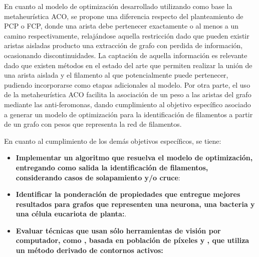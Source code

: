 En cuanto al modelo de optimizaci\'on desarrollado utilizando como base la metaheur\'istica ACO, se propone una diferencia respecto del planteamiento de PCP o FCP, donde una arista debe pertenecer exactamente o al menos a un camino respectivamente, relaj\'andose aquella restricci\'on dado que pueden existir aristas aisladas producto una extracci\'on de grafo con perdida de informaci\'on, ocasionando discontinuidades. La captaci\'on de aquella informaci\'on es relevante dado que existen m\'etodos en el estado del arte que permiten realizar la uni\'on de una arista aislada y el filamento al que potencialmente puede pertenecer, pudiendo incorporarse como etapas adicionales al modelo.
Por otra parte, el uso de la metaheur\'istica ACO facilita la asociaci\'on de un peso a las aristas del grafo mediante las anti-feromonas, dando cumplimiento al objetivo espec\'ifico asociado a generar un modelo de optimizaci\'on para la identificaci\'on de filamentos a partir de un grafo con pesos que representa la red de filamentos.

En cuanto al cumplimiento de los dem\'as objetivos espec\'ificos, se tiene:
\begin{itemize}
    \item {\bf Implementar un algoritmo que resuelva el modelo de optimizaci\'on, entregando como salida la identificaci\'on de filamentos, considerando casos de solapamiento y/o cruce}: 
    
    \item {\bf Identificar la ponderaci\'on de propiedades que entregue mejores resultados para grafos que representen una neurona, una bacteria y una c\'elula eucariota de planta:}.
    
    \item {\bf Evaluar t\'ecnicas que usan s\'olo herramientas de visi\'on por computador, como \cite{boudaoud2014fibriltool}, basada en poblaci\'on de p\'ixeles y \cite{xu2015soax}, que utiliza un m\'etodo derivado de contornos activos:} 
\end{itemize}

